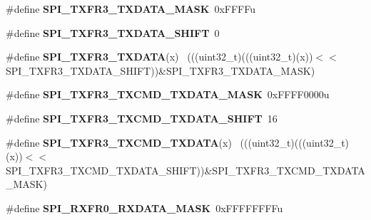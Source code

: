 \begin{DoxyCompactItemize}
\item 
\hypertarget{group___s_p_i___register___masks_gac55f871f2a4bd1462049674e1b69d771}{}\#define {\bfseries S\+P\+I\+\_\+\+T\+X\+F\+R3\+\_\+\+T\+X\+D\+A\+T\+A\+\_\+\+M\+A\+S\+K}~0x\+F\+F\+F\+Fu\label{group___s_p_i___register___masks_gac55f871f2a4bd1462049674e1b69d771}

\item 
\hypertarget{group___s_p_i___register___masks_ga13d115127f0f26ef2f4afac9d4fcafd9}{}\#define {\bfseries S\+P\+I\+\_\+\+T\+X\+F\+R3\+\_\+\+T\+X\+D\+A\+T\+A\+\_\+\+S\+H\+I\+F\+T}~0\label{group___s_p_i___register___masks_ga13d115127f0f26ef2f4afac9d4fcafd9}

\item 
\hypertarget{group___s_p_i___register___masks_gad37d45ef297944f9a4d87551d7b31a4c}{}\#define {\bfseries S\+P\+I\+\_\+\+T\+X\+F\+R3\+\_\+\+T\+X\+D\+A\+T\+A}(x)                                        ~(((uint32\+\_\+t)(((uint32\+\_\+t)(x))$<$$<$S\+P\+I\+\_\+\+T\+X\+F\+R3\+\_\+\+T\+X\+D\+A\+T\+A\+\_\+\+S\+H\+I\+F\+T))\&S\+P\+I\+\_\+\+T\+X\+F\+R3\+\_\+\+T\+X\+D\+A\+T\+A\+\_\+\+M\+A\+S\+K)\label{group___s_p_i___register___masks_gad37d45ef297944f9a4d87551d7b31a4c}

\item 
\hypertarget{group___s_p_i___register___masks_ga5db2d61f529d80173f78729f46c098a9}{}\#define {\bfseries S\+P\+I\+\_\+\+T\+X\+F\+R3\+\_\+\+T\+X\+C\+M\+D\+\_\+\+T\+X\+D\+A\+T\+A\+\_\+\+M\+A\+S\+K}~0x\+F\+F\+F\+F0000u\label{group___s_p_i___register___masks_ga5db2d61f529d80173f78729f46c098a9}

\item 
\hypertarget{group___s_p_i___register___masks_ga22a70393315807bfa3480a1892da3531}{}\#define {\bfseries S\+P\+I\+\_\+\+T\+X\+F\+R3\+\_\+\+T\+X\+C\+M\+D\+\_\+\+T\+X\+D\+A\+T\+A\+\_\+\+S\+H\+I\+F\+T}~16\label{group___s_p_i___register___masks_ga22a70393315807bfa3480a1892da3531}

\item 
\hypertarget{group___s_p_i___register___masks_gabede564e52c186605d574c0ede82daf2}{}\#define {\bfseries S\+P\+I\+\_\+\+T\+X\+F\+R3\+\_\+\+T\+X\+C\+M\+D\+\_\+\+T\+X\+D\+A\+T\+A}(x)                            ~(((uint32\+\_\+t)(((uint32\+\_\+t)(x))$<$$<$S\+P\+I\+\_\+\+T\+X\+F\+R3\+\_\+\+T\+X\+C\+M\+D\+\_\+\+T\+X\+D\+A\+T\+A\+\_\+\+S\+H\+I\+F\+T))\&S\+P\+I\+\_\+\+T\+X\+F\+R3\+\_\+\+T\+X\+C\+M\+D\+\_\+\+T\+X\+D\+A\+T\+A\+\_\+\+M\+A\+S\+K)\label{group___s_p_i___register___masks_gabede564e52c186605d574c0ede82daf2}

\item 
\hypertarget{group___s_p_i___register___masks_ga61ebb4d00d387b335d5b9d64d024e16f}{}\#define {\bfseries S\+P\+I\+\_\+\+R\+X\+F\+R0\+\_\+\+R\+X\+D\+A\+T\+A\+\_\+\+M\+A\+S\+K}~0x\+F\+F\+F\+F\+F\+F\+F\+Fu\label{group___s_p_i___register___masks_ga61ebb4d00d387b335d5b9d64d024e16f}


\end{DoxyCompactItemize}
